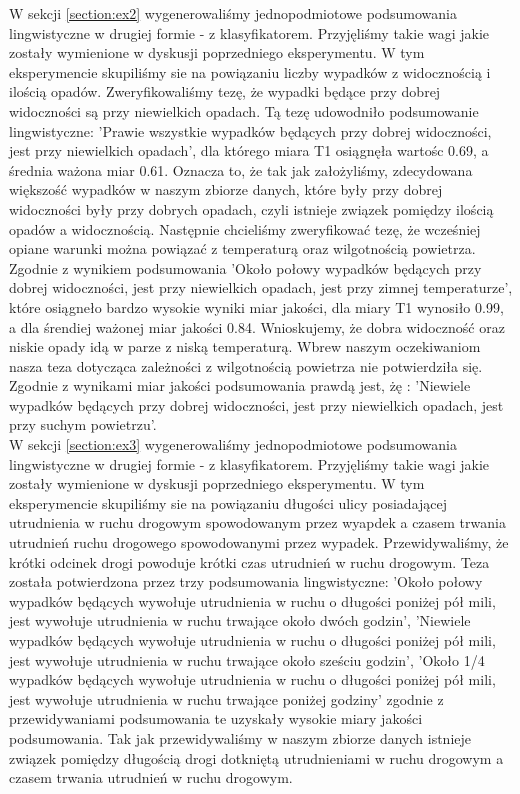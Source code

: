 \documentclass{classrep}
\begin{document}
W sekcji \ref{section:ex2} wygenerowaliśmy jednopodmiotowe podsumowania lingwistyczne w drugiej formie - z klasyfikatorem. Przyjęliśmy takie wagi jakie zostały wymienione w dyskusji poprzedniego eksperymentu. W tym eksperymencie skupiliśmy sie na powiązaniu liczby wypadków z widocznością i ilością opadów. Zweryfikowaliśmy tezę, że wypadki będące przy dobrej widoczności są przy niewielkich opadach. Tą tezę udowodniło podsumowanie lingwistyczne: 'Prawie wszystkie wypadków będących przy dobrej widoczności, jest przy niewielkich opadach', dla którego miara T1 osiągnęła wartośc 0.69, a średnia ważona miar 0.61. Oznacza to, że tak jak założyliśmy, zdecydowana większość wypadków w naszym zbiorze danych, które były przy dobrej widoczności były przy dobrych opadach, czyli istnieje związek pomiędzy ilością opadów a widocznością. Następnie chcieliśmy zweryfikować tezę,  że wcześniej opiane warunki można powiązać z temperaturą oraz wilgotnością powietrza. Zgodnie z wynikiem podsumowania 'Około połowy wypadków będących przy dobrej widoczności, jest przy niewielkich opadach, jest przy zimnej temperaturze', które osiągneło bardzo wysokie wyniki miar jakości, dla miary T1 wynosiło 0.99, a dla śrendiej ważonej miar jakości 0.84. Wnioskujemy, że dobra widoczność oraz niskie opady idą w parze z niską temperaturą. Wbrew naszym oczekiwaniom nasza teza dotycząca zależności z wilgotnością powietrza nie potwierdziła się. Zgodnie z wynikami miar jakości podsumowania prawdą jest, żę : 'Niewiele wypadków będących przy dobrej widoczności, jest przy niewielkich opadach, jest przy suchym powietrzu'. \\

W sekcji \ref{section:ex3} wygenerowaliśmy jednopodmiotowe podsumowania lingwistyczne w drugiej formie - z klasyfikatorem. Przyjęliśmy takie wagi jakie zostały wymienione w dyskusji poprzedniego eksperymentu. W tym eksperymencie skupiliśmy sie na powiązaniu długości ulicy posiadającej utrudnienia w ruchu drogowym spowodowanym przez wyapdek a czasem trwania utrudnień ruchu drogowego spowodowanymi przez wypadek. Przewidywaliśmy, że krótki odcinek drogi powoduje krótki czas utrudnień w ruchu drogowym. Teza została potwierdzona przez trzy podsumowania lingwistyczne: 'Około połowy wypadków będących wywołuje utrudnienia w ruchu o długości poniżej pół mili, jest wywołuje utrudnienia w ruchu trwające około dwóch godzin', 'Niewiele wypadków będących wywołuje utrudnienia w ruchu o długości poniżej pół mili, jest wywołuje utrudnienia w ruchu trwające około sześciu godzin', 'Około 1/4 wypadków będących wywołuje utrudnienia w ruchu o długości poniżej pół mili, jest wywołuje utrudnienia w ruchu trwające poniżej godziny' zgodnie z przewidywaniami podsumowania te uzyskały wysokie miary jakości podsumowania. Tak jak przewidywaliśmy w naszym zbiorze danych istnieje związek pomiędzy długością drogi dotkniętą utrudnieniami w ruchu drogowym a czasem trwania utrudnień w ruchu drogowym. 
\end{document}
